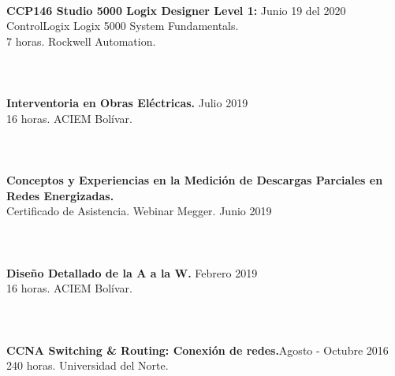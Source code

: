 \documentclass[margin]{res}
\begin{document}
\begin{resume}
\\\textbf{CCP146 Studio 5000 Logix Designer Level 1:} \hfill Junio 19 del 2020
\\ControlLogix Logix 5000 System Fundamentals.
\\ 7 horas. Rockwell Automation. 

\section{\centering}
\hfill
\\\textbf{Interventoria en Obras Eléctricas.} \hfill Julio 2019
\\ 16 horas. ACIEM Bolívar. 

\section{\centering}
\hfill
\\\textbf{Conceptos y Experiencias en la Medición de Descargas Parciales en Redes Energizadas.} 
\\ Certificado de Asistencia. Webinar Megger. \hfill Junio 2019

\section{\centering}
\hfill
\\\textbf{Diseño Detallado de la A a la W.} \hfill Febrero 2019
\\16 horas. ACIEM Bolívar.

\section{\centering}
\hfill
\\\textbf{CCNA Switching \& Routing: Conexión de redes.}\hfill Agosto - Octubre 2016
\\240 horas. Universidad del Norte. 


\end{resume}
\end{document}
